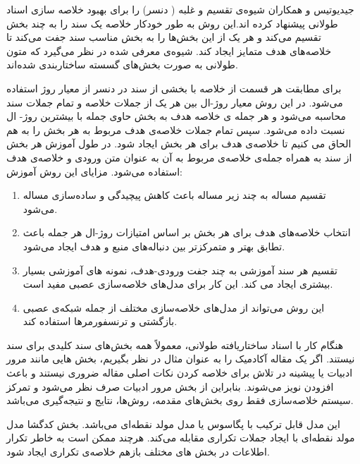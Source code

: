     

جیدیوتیس و همکاران  شیوه‌ی تقسیم و غلبه ( دنسر) 
را  برای بهبود خلاصه سازی اسناد طولانی پیشنهاد کرده اند.این روش به طور خودکار خلاصه یک سند را به چند بخش‌ تقسیم می‌کند و هر یک از این بخش‌ها را به بخش مناسب سند جفت می‌کند تا خلاصه‌های هدف متمایز ایجاد کند. شیوه‌ی معرفی شده در نظر می‌گیرد که متون طولانی به صورت بخش‌های گسسته ساختاربندی شده‌اند. 

برای مطابقت هر قسمت از خلاصه با بخشی از سند در دنسر از معیار روژ 
استفاده  ‌می‌شود. در این روش معیار روژ-ال بین هر یک از جملات خلاصه و تمام جملات سند محاسبه می‌شود و هر جمله ی خلاصه هدف به بخش حاوی جمله با بیشترین روژ- ال نسبت داده می‌شود. 
سپس تمام جملات خلاصه‌ی هدف مربوط به هر بخش را به هم الحاق می کنیم تا خلاصه‌ی هدف برای هر بخش ایجاد شود. در طول آموزش هر بخش از سند به همراه جمله‌ی خلاصه‌ی مربوط به آن به عنوان متن ورودی و خلاصه‌ی هدف استفاده می‌شود. 
مزایای این روش آموزش:
\begin{enumerate}
	\item {
		 تقسیم مساله به چند زیر مساله باعث کاهش پیچیدگی و ساده‌سازی مساله می‌شود.
	}
	\item {
		انتخاب خلاصه‌های هدف برای هر بخش بر اساس امتیازات روژ-ال هر جمله باعث تطابق بهتر و متمرکزتر بین دنباله‌های منبع و هدف ایجاد می‌شود.
	}
	\item {
تقسیم هر سند آموزشی به چند جفت ورودی-هدف، نمونه های آموزشی بسیار بیشتری ایجاد می کند. این کار برای مدل‌های خلاصه‌سازی عصبی مفید است. 	
}
	\item {
	این روش می‌تواند از مدل‌های خلاصه‌سازی مختلف از جمله شبکه‌ی عصبی بازگشتی و ترنسفورمرها استفاده کند.
}
\end{enumerate}


هنگام کار با اسناد ساختاریافته طولانی، معمولاً همه بخش‌های سند کلیدی برای سند نیستند. اگر یک مقاله آکادمیک را به عنوان مثال در نظر بگیریم، بخش هایی مانند مرور ادبیات یا پیشینه در تلاش برای خلاصه کردن نکات اصلی مقاله ضروری نیستند و باعث افزودن نویز می‌شوند. بنابراین از بخش مرور ادبیات صرف نظر می‌شود و تمرکز سیستم خلاصه‌سازی فقط  روی بخش‌های مقدمه، روش‌ها، نتایج و نتیجه‌گیری می‌باشد.

این مدل قابل ترکیب با پگاسوس یا مدل مولد نقطه‌ای 
می‌باشد.
بخش کدگشا مدل مولد نقطه‌ای با ایجاد جملات تکراری مقابله ‌می‌کند.
هرچند ممکن است به خاطر تکرار اطلاعات در بخش های مختلف بازهم خلاصه‌ی تکراری ایجاد شود.

